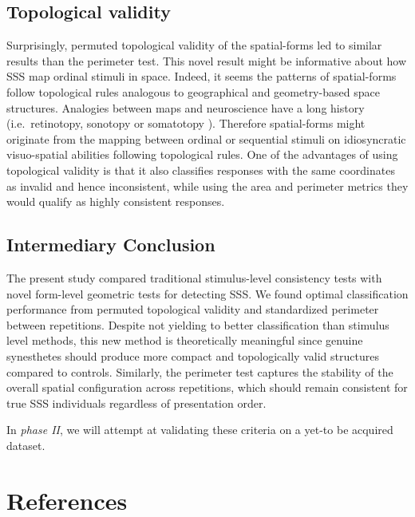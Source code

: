 \documentclass[
  man,
  floatsintext,
  longtable,
  a4paper,
  nolmodern,
  notxfonts,
  notimes,
  colorlinks=true,linkcolor=blue,citecolor=blue,urlcolor=blue]{apa7}
\begin{document}
\subsection{Topological validity}\label{topological-validity}

Surprisingly, permuted topological validity of the spatial-forms led to
similar results than the perimeter test. This novel result might be
informative about how SSS map ordinal stimuli in space. Indeed, it seems
the patterns of spatial-forms follow topological rules analogous to
geographical and geometry-based space structures. Analogies between maps
and neuroscience have a long history (i.e.~retinotopy, sonotopy or
somatotopy ).
Therefore spatial-forms might originate from the mapping between ordinal
or sequential stimuli on idiosyncratic visuo-spatial abilities following
topological rules. One of the advantages of using topological validity
is that it also classifies responses with the same coordinates as
invalid and hence inconsistent, while using the area and perimeter
metrics they would qualify as highly consistent responses.

\subsection{Intermediary Conclusion}\label{sec-conclusions}

The present study compared traditional stimulus-level consistency tests
with novel form-level geometric tests for detecting SSS. We found
optimal classification performance from permuted topological validity
and standardized perimeter between repetitions. Despite not yielding to
better classification than stimulus level methods, this new method is
theoretically meaningful since genuine synesthetes should produce more
compact and topologically valid structures compared to controls.
Similarly, the perimeter test captures the stability of the overall
spatial configuration across repetitions, which should remain consistent
for true SSS individuals regardless of presentation order.

In \emph{phase II}, we will attempt at validating these criteria on a
yet-to be acquired dataset.

\section{References}\label{references}
\end{document}
